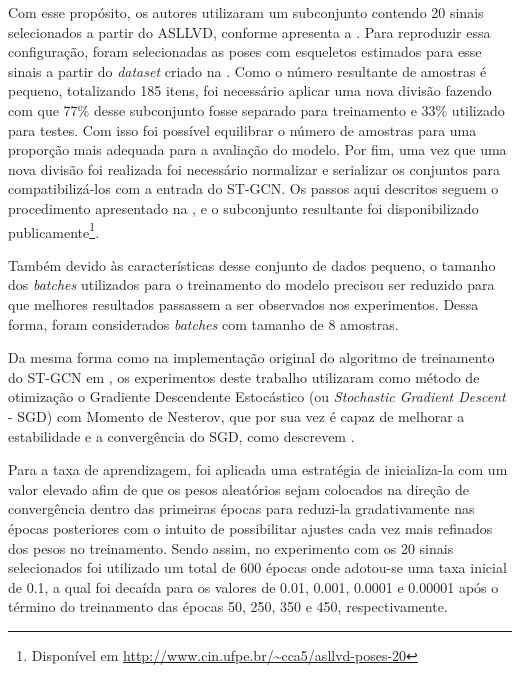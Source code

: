Com esse propósito, os autores utilizaram um subconjunto contendo 20 sinais selecionados a partir do ASLLVD, conforme apresenta a . Para reproduzir essa configuração, foram selecionadas as poses com esqueletos estimados para esse sinais a partir do \textit{dataset} criado na . Como o número resultante de amostras é pequeno, totalizando 185 itens, foi necessário aplicar uma nova divisão fazendo com que 77\% desse subconjunto fosse separado para treinamento e 33\% utilizado para testes. Com isso foi possível equilibrar o número de amostras para uma proporção mais adequada para a avaliação do modelo. Por fim, uma vez que uma nova divisão foi realizada foi necessário normalizar e serializar os conjuntos para compatibilizá-los com a entrada do ST-GCN. Os passos aqui descritos seguem o procedimento apresentado na , e o subconjunto resultante foi disponibilizado publicamente\footnote{
    Disponível em \url{http://www.cin.ufpe.br/~cca5/asllvd-poses-20}
}.

Também devido às características desse conjunto de dados pequeno, o tamanho dos \textit{batches} utilizados para o treinamento do modelo precisou ser reduzido para que melhores resultados passassem a ser observados nos experimentos. Dessa forma, foram considerados \textit{batches} com tamanho de 8 amostras.

Da mesma forma como na implementação original do algoritmo de treinamento do ST-GCN em \cite{st-gcn-2018}, os experimentos deste trabalho utilizaram como método de otimização o Gradiente Descendente Estocástico (ou \textit{Stochastic Gradient Descent} - SGD) com Momento de Nesterov, que por sua vez é capaz de melhorar a estabilidade e a convergência do SGD, como descrevem \cite{stanford-2018, bengio-2013, sutskever-2013}.

Para a taxa de aprendizagem, foi aplicada uma estratégia de inicializa-la com um valor elevado afim de que os pesos aleatórios sejam colocados na direção de convergência dentro das primeiras épocas para reduzi-la gradativamente nas épocas posteriores com o intuito de possibilitar ajustes cada vez mais refinados dos pesos no treinamento. Sendo assim, no experimento com os 20 sinais selecionados foi utilizado um total de 600 épocas onde adotou-se uma taxa inicial de 0.1, a qual foi decaída para os valores de 0.01, 0.001, 0.0001 e 0.00001 após o término do treinamento das épocas 50, 250, 350 e 450, respectivamente.


